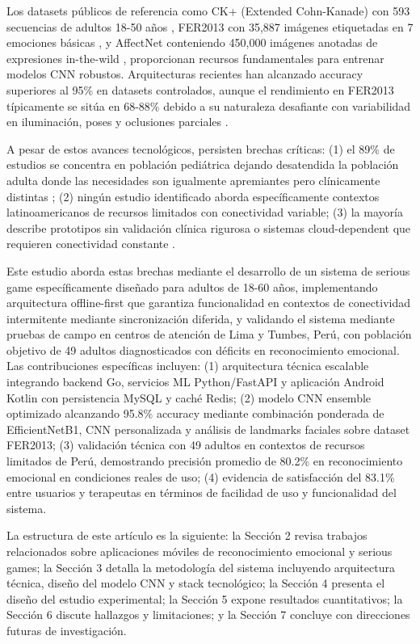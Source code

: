 \documentclass[journal,article,submit,pdftex,moreauthors]{Definitions/mdpi}
\begin{document}
	Los datasets públicos de referencia como CK+ (Extended Cohn-Kanade) con 593 secuencias de adultos 18-50 años \cite{ref14}, FER2013 con 35,887 imágenes etiquetadas en 7 emociones básicas \cite{ref16,ref17}, y AffectNet conteniendo 450,000 imágenes anotadas de expresiones in-the-wild \cite{ref13}, proporcionan recursos fundamentales para entrenar modelos CNN robustos. Arquitecturas recientes han alcanzado accuracy superiores al 95\% en datasets controlados, aunque el rendimiento en FER2013 típicamente se sitúa en 68-88\% debido a su naturaleza desafiante con variabilidad en iluminación, poses y oclusiones parciales \cite{ref3,ref9,ref19}.
	
	A pesar de estos avances tecnológicos, persisten brechas críticas: (1) el 89\% de estudios se concentra en población pediátrica dejando desatendida la población adulta donde las necesidades son igualmente apremiantes pero clínicamente distintas \cite{ref18}; (2) ningún estudio identificado aborda específicamente contextos latinoamericanos de recursos limitados con conectividad variable; (3) la mayoría describe prototipos sin validación clínica rigurosa o sistemas cloud-dependent que requieren conectividad constante \cite{ref1,ref2}.
	
	Este estudio aborda estas brechas mediante el desarrollo de un sistema de serious game específicamente diseñado para adultos de 18-60 años, implementando arquitectura offline-first que garantiza funcionalidad en contextos de conectividad intermitente mediante sincronización diferida, y validando el sistema mediante pruebas de campo en centros de atención de Lima y Tumbes, Perú, con población objetivo de 49 adultos diagnosticados con déficits en reconocimiento emocional. Las contribuciones específicas incluyen: (1) arquitectura técnica escalable integrando backend Go, servicios ML Python/FastAPI y aplicación Android Kotlin con persistencia MySQL y caché Redis; (2) modelo CNN ensemble optimizado alcanzando 95.8\% accuracy mediante combinación ponderada de EfficientNetB1, CNN personalizada y análisis de landmarks faciales sobre dataset FER2013; (3) validación técnica con 49 adultos en contextos de recursos limitados de Perú, demostrando precisión promedio de 80.2\% en reconocimiento emocional en condiciones reales de uso; (4) evidencia de satisfacción del 83.1\% entre usuarios y terapeutas en términos de facilidad de uso y funcionalidad del sistema.
	
	La estructura de este artículo es la siguiente: la Sección 2 revisa trabajos relacionados sobre aplicaciones móviles de reconocimiento emocional y serious games; la Sección 3 detalla la metodología del sistema incluyendo arquitectura técnica, diseño del modelo CNN y stack tecnológico; la Sección 4 presenta el diseño del estudio experimental; la Sección 5 expone resultados cuantitativos; la Sección 6 discute hallazgos y limitaciones; y la Sección 7 concluye con direcciones futuras de investigación.
	
\end{document}
